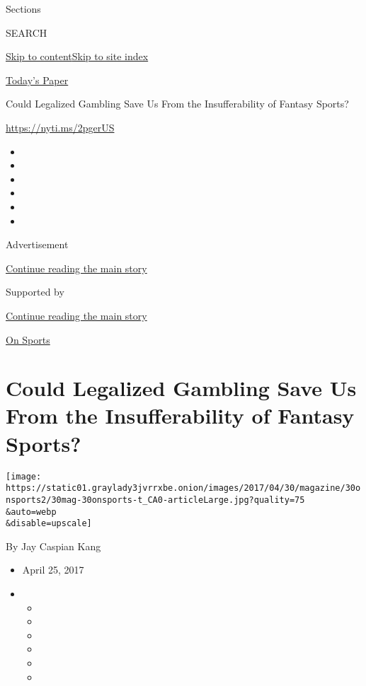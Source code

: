 Sections

SEARCH

\protect\hyperlink{site-content}{Skip to
content}\protect\hyperlink{site-index}{Skip to site index}

\href{https://myaccount.nytimes3xbfgragh.onion/auth/login?response_type=cookie\&client_id=vi}{}

\href{https://www.nytimes3xbfgragh.onion/section/todayspaper}{Today's
Paper}

Could Legalized Gambling Save Us From the Insufferability of Fantasy
Sports?

\url{https://nyti.ms/2pgerUS}

\begin{itemize}
\item
\item
\item
\item
\item
\item
\end{itemize}

Advertisement

\protect\hyperlink{after-top}{Continue reading the main story}

Supported by

\protect\hyperlink{after-sponsor}{Continue reading the main story}

\href{/column/on-sports}{On Sports}

\hypertarget{could-legalized-gambling-save-us-from-the-insufferability-of-fantasy-sports}{%
\section{Could Legalized Gambling Save Us From the Insufferability of
Fantasy
Sports?}\label{could-legalized-gambling-save-us-from-the-insufferability-of-fantasy-sports}}

\texttt{[image: https://static01.graylady3jvrrxbe.onion/images/2017/04/30/magazine/30onsports2/30mag-30onsports-t\_CA0-articleLarge.jpg?quality=75\\\&auto=webp\\\&disable=upscale]}

By Jay Caspian Kang

\begin{itemize}
\item
  April 25, 2017
\item
  \begin{itemize}
  \item
  \item
  \item
  \item
  \item
  \item
  \end{itemize}
\end{itemize}

